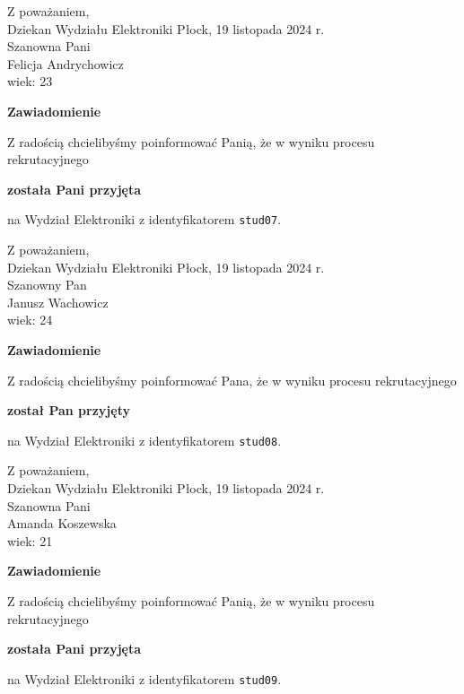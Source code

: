 \documentclass[12pt,a4paper]{article}
\begin{document}
\noindent
Z poważaniem,\\
Dziekan
Wydziału Elektroniki
\newpage
\hfill Płock, 19 listopada 2024 r.\\ 
\noindent 
Szanowna Pani \\
Felicja Andrychowicz \\
wiek: 23

\bigskip

\begin{center}
{\Large\textbf{Zawiadomienie}}
\end{center}
\bigskip
Z radością chcielibyśmy poinformować Panią, że w wyniku procesu rekrutacyjnego
\begin{center}
\textsf{\textbf{została Pani przyjęta}} 
\end{center}
na Wydział Elektroniki z identyfikatorem \verb|stud07|.
\vspace{2cm}

\noindent
Z poważaniem,\\
Dziekan
Wydziału Elektroniki
\newpage
\hfill Płock, 19 listopada 2024 r.\\ 
\noindent 
Szanowny Pan \\
Janusz Wachowicz \\
wiek: 24

\bigskip

\begin{center}
{\Large\textbf{Zawiadomienie}}
\end{center}
\bigskip
Z radością chcielibyśmy poinformować Pana, że w wyniku procesu rekrutacyjnego
\begin{center}
\textsf{\textbf{został Pan przyjęty}} 
\end{center}
na Wydział Elektroniki z identyfikatorem \verb|stud08|.
\vspace{2cm}

\noindent
Z poważaniem,\\
Dziekan
Wydziału Elektroniki
\newpage
\hfill Płock, 19 listopada 2024 r.\\ 
\noindent 
Szanowna Pani \\
Amanda Koszewska \\
wiek: 21

\bigskip

\begin{center}
{\Large\textbf{Zawiadomienie}}
\end{center}
\bigskip
Z radością chcielibyśmy poinformować Panią, że w wyniku procesu rekrutacyjnego
\begin{center}
\textsf{\textbf{została Pani przyjęta}} 
\end{center}
na Wydział Elektroniki z identyfikatorem \verb|stud09|.
\vspace{2cm}
\end{document}
